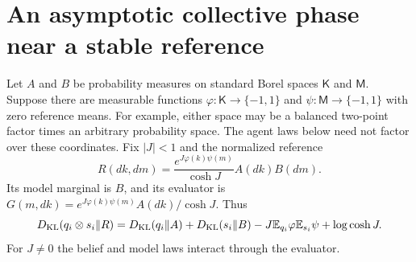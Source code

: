 \section{An asymptotic collective phase near a stable reference}
\label{sec:public-phase}

Let $A$ and $B$ be probability measures on standard Borel spaces $\mathsf K$ and $\mathsf M$. Suppose there are measurable functions $\varphi:\mathsf K\to\{-1,1\}$ and $\psi:\mathsf M\to\{-1,1\}$ with zero reference means. For example, either space may be a balanced two-point factor times an arbitrary probability space. The agent laws below need not factor over these coordinates. Fix $|J|<1$ and the normalized reference
\begin{equation}
 R(dk,dm)=\frac{e^{J\varphi(k)\psi(m)}}{\cosh J}A(dk)B(dm).
 \label{eq:public-phase-reference}
\end{equation}
Its model marginal is $B$, and its evaluator is $G(m,dk)=e^{J\varphi(k)\psi(m)}A(dk)/\cosh J$. Thus
\begin{equation}
 D_{\mathrm{KL}}(q_i\otimes s_i\Vert R)
 =D_{\mathrm{KL}}(q_i\Vert A)+D_{\mathrm{KL}}(s_i\Vert B)
 -J\mathbb E_{q_i}\varphi\mathbb E_{s_i}\psi+\log\cosh J.
 \label{eq:public-phase-local}
\end{equation}
For $J\ne0$ the belief and model laws interact through the evaluator.

